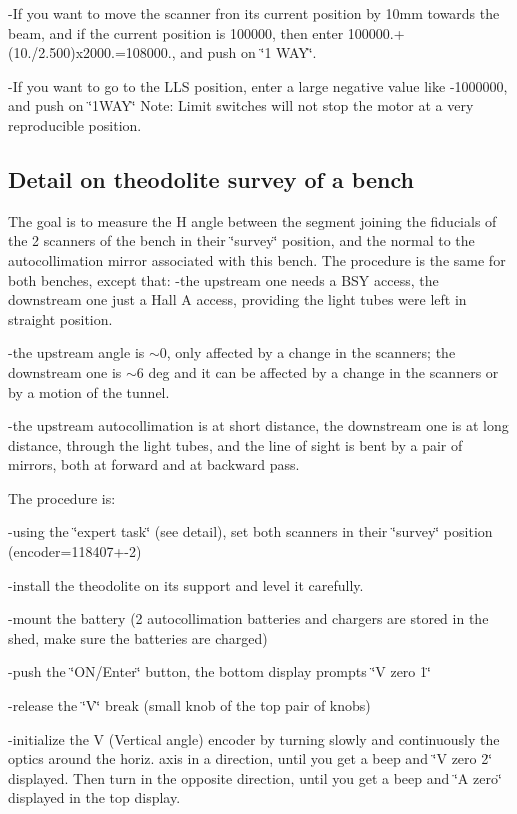 -If you want to move the scanner fron its current position by 10mm towards the
beam, and if the current position is 100000, then enter 100000.+(10./2.500)x2000.=108000.,
and push on \char`\"{}1 WAY\char`\"{}. 

-If you want to go to the LLS position, enter a large negative value like -1000000,
and push on \char`\"{}1WAY\char`\"{} Note: Limit switches will not stop the
motor at a very reproducible position.


\subsection{Detail on theodolite survey of a bench }

The goal is to measure the H angle between the segment joining the fiducials
of the 2 scanners of the bench in their \char`\"{}survey\char`\"{} position,
and the normal to the autocollimation mirror associated with this bench. The
procedure is the same for both benches, except that: -the upstream one needs
a BSY access, the downstream one just a Hall A access, providing the light tubes
were left in straight position. 

-the upstream angle is \( \sim  \)0, only affected by a change in the scanners;
the downstream one is \( \sim  \)6 deg and it can be affected by a change in
the scanners or by a motion of the tunnel. 

-the upstream autocollimation is at short distance, the downstream one is at
long distance, through the light tubes, and the line of sight is bent by a pair
of mirrors, both at forward and at backward pass. 

The procedure is: 

-using the \char`\"{}expert task\char`\"{} (see detail), set both scanners in
their \char`\"{}survey\char`\"{} position (encoder=118407+-2) 

-install the theodolite on its support and level it carefully. 

-mount the battery (2 autocollimation batteries and chargers are stored in the
shed, make sure the batteries are charged) 

-push the \char`\"{}ON/Enter\char`\"{} button, the bottom display prompts \char`\"{}V
zero 1\char`\"{} 

-release the \char`\"{}V\char`\"{} break (small knob of the top pair of knobs) 

-initialize the V (Vertical angle) encoder by turning slowly and continuously
the optics around the horiz. axis in a direction, until you get a beep and \char`\"{}V
zero 2\char`\"{} displayed. Then turn in the opposite direction, until you get
a beep and \char`\"{}A zero\char`\"{} displayed in the top display. 

